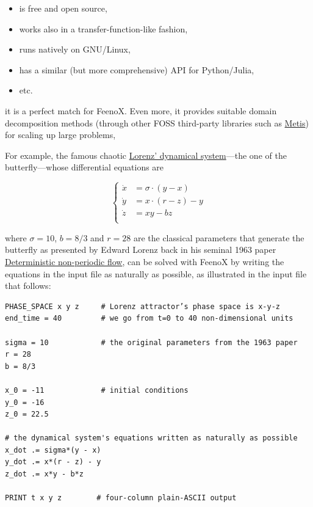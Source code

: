 \documentclass[
  american,
]{article}
\providecommand{\tightlist}{%
  \setlength{\itemsep}{0pt}\setlength{\parskip}{0pt}}
\begin{document}
\begin{itemize}
\tightlist
\item
  is free and open source,
\item
  works also in a transfer-function-like fashion,
\item
  runs natively on GNU/Linux,
\item
  has a similar (but more comprehensive) API for Python/Julia,
\item
  etc.
\end{itemize}

\noindent it is a perfect match for FeenoX. Even more, it provides
suitable domain decomposition methods (through other FOSS third-party
libraries such as
\href{http://glaros.dtc.umn.edu/gkhome/metis/metis/overview}{Metis}) for
scaling up large problems,

For example, the famous chaotic
\href{http://en.wikipedia.org/wiki/Lorenz_system}{Lorenz' dynamical
system}---the one of the butterfly---whose differential equations are

\begin{equation*}
\begin{cases}
\dot{x} &= \sigma \cdot (y - x)  \\
\dot{y} &= x \cdot (r - z) - y   \\
\dot{z} &= x y - b z       \\
\end{cases}
\end{equation*}

where \(\sigma=10\), \(b=8/3\) and \(r=28\) are the classical parameters
that generate the butterfly as presented by Edward Lorenz back in his
seminal 1963 paper
\href{http://journals.ametsoc.org/doi/abs/10.1175/1520-0469\%281963\%29020\%3C0130\%3ADNF\%3E2.0.CO\%3B2}{Deterministic
non-periodic flow}, can be solved with FeenoX by writing the equations
in the input file as naturally as possible, as illustrated in the input
file that follows:

\begin{lstlisting}[style=feenox]
PHASE_SPACE x y z     # Lorenz attractor’s phase space is x-y-z
end_time = 40         # we go from t=0 to 40 non-dimensional units

sigma = 10            # the original parameters from the 1963 paper
r = 28
b = 8/3

x_0 = -11             # initial conditions
y_0 = -16
z_0 = 22.5

# the dynamical system's equations written as naturally as possible
x_dot .= sigma*(y - x)
y_dot .= x*(r - z) - y
z_dot .= x*y - b*z

PRINT t x y z        # four-column plain-ASCII output
\end{lstlisting}
\end{document}

